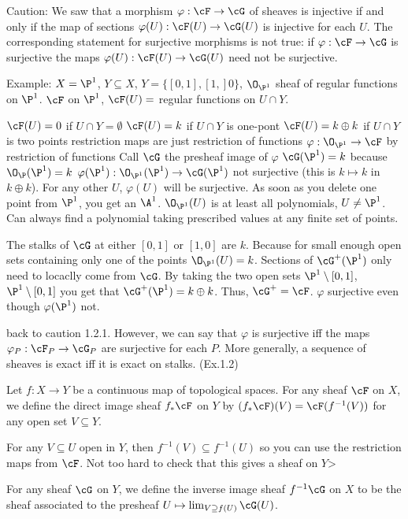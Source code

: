 Caution: We saw that a morphism $\varphi: \cF \to \cG$ of sheaves is injective if and only if the map of sections $\varphi(U): \cF(U) \to \cG(U)$ is injective for each $U$. The corresponding statement for surjective morphisms is not true: if $\varphi: \cF \to \cG$ is surjective the maps $\varphi(U): \cF(U) \to \cG(U)$ need not be surjective.

Example: $X= \P^1$, $Y \subseteq X$, $Y= \{ [0,1], [1,]0 \}$, $\O_{\P^1}$ sheaf of regular functions on $\P^1$. $\cF$ on $\P^1$, $\cF(U)=$ regular functions on $U \cap Y$. 

$\cF(U)= 0$ if $U \cap Y= \emptyset$
$\cF(U)= k$ if $U \cap Y$ is one-pont 
$\cF(U)= k \oplus k$ if $U \cap Y$ is two points
restriction maps are just restriction of functions
$\varphi: \O_{\P^1} \to \cF$ by restriction of functions 
Call $\cG$ the presheaf image of $\varphi$
$\cG(\P^1)= k$ because $\O_\P(\P^1)= k$
$\varphi(\P^1): \O_{\P^1}(\P^1) \to \cG(\P^1)$ not surjective (this is $k \mapsto k$ in $k \oplus k$). For any other $U$, $\varphi(U)$ will be surjective. As soon as you delete one point from $\P^1$, you get an $\A^1$. $\O_{\P^1}(U)$ is at least all polynomials, $U \neq \P^1$. 
Can always find a polynomial taking prescribed values at any finite set of points. 

The stalks of $\cG$ at either $[0,1]$ or $[1,0]$ are $k$. Because for small enough open sets containing only one of the points $\O_{\P^1}(U)= k$. Sections of $\cG^+(\P^1)$ only need to locaclly come from $\cG$. By taking the two open sets $\P^1 \setminus [0,1]$, $\P^1 \setminus [0,1]$ you get that $\cG^+(\P^1)= k \oplus k$. Thus, $\cG^+= \cF$. $\varphi$ surjective even though $\varphi(\P^1)$ not.


back to caution 1.2.1. However, we can say that $\varphi$ is surjective iff the maps $\varphi_P: \cF_P \to \cG_P$ are surjective for each $P$. More generally, a sequence of sheaves is exact iff it is exact on stalks. (Ex.1.2)


\begin{dfn}
Let $f: X \to Y$ be a continuous map of topological spaces. For any sheaf $\cF$ on $X$, we define the direct image sheaf $f_* \cF$ on $Y$ by $(f_*\cF)(V)= \cF(f^{-1}(V))$ for any open set $V \subseteq Y$. 
\end{dfn}

For any $V \subseteq U$ open in $Y$, then $f^{-1}(V) \subseteq f^{-1}(U)$ so you can use the restriction maps from $\cF$. Not too  hard to check that this gives a sheaf on $Y$> 


For any sheaf $\cG$ on $Y$, we define the inverse image sheaf $f^{-1} \cG$ on $X$ to be the sheaf associated to the presheaf $U \mapsto \lim_{V \supseteq f(U)} \cG(U)$.

